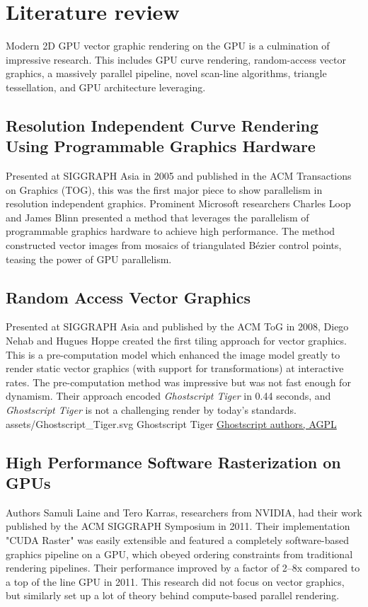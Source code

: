 \section{Literature review}

Modern 2D GPU vector graphic rendering on the GPU is a culmination of impressive research. This includes GPU curve rendering\cite{Loop05}, random-access vector graphics\cite{Nehab08}, a massively parallel pipeline\cite{Ganacim14}, novel scan-line algorithms\cite{Li16}, triangle tessellation\cite{Silva18}, and GPU architecture leveraging\cite{Levien20}.

\subsection{Resolution Independent Curve Rendering Using Programmable Graphics Hardware\cite{Loop05}}

Presented at SIGGRAPH Asia in 2005 and published in the ACM Transactions on Graphics (TOG), this was the first major piece to show parallelism in resolution independent graphics. Prominent Microsoft researchers Charles Loop and James Blinn presented a method that leverages the parallelism of programmable graphics hardware to achieve high performance. The method constructed vector images from mosaics of triangulated Bézier control points, teasing the power of GPU parallelism.

\subsection{Random Access Vector Graphics\cite{Nehab08}}

Presented at SIGGRAPH Asia and published by the ACM ToG in 2008, Diego Nehab and Hugues Hoppe created the first tiling approach for vector graphics. This is a pre-computation model which enhanced the image model greatly to render static vector graphics (with support for transformations) at interactive rates. The pre-computation method was impressive but was not fast enough for dynamism. Their approach encoded \textit{Ghostscript Tiger} in 0.44 seconds, and \textit{Ghostscript Tiger} is not a challenging render by today's standards.\\

\smallsvg
{assets/Ghostscript_Tiger.svg}
{Ghostscript Tiger}
{\href{http://www.gnu.org/licenses/agpl.html}{Ghostscript authors, AGPL}}

\subsection{High Performance Software Rasterization on GPUs\cite{Laine11}}
Authors Samuli Laine and Tero Karras, researchers from NVIDIA, had their work published by the ACM SIGGRAPH Symposium in 2011. Their implementation "CUDA Raster" was easily extensible and featured a completely software-based graphics pipeline on a GPU, which obeyed ordering constraints from traditional rendering pipelines. Their performance improved by a factor of 2–8x compared to a top of the line GPU in 2011. This research did not focus on vector graphics, but similarly set up a lot of theory behind compute-based parallel rendering.\\

